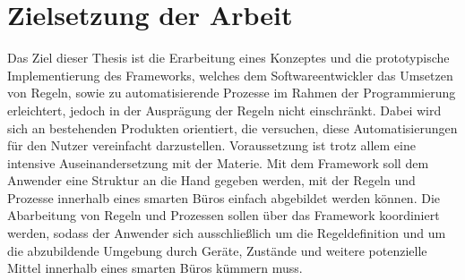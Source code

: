\section{Zielsetzung der Arbeit}
\label{sec:zielsetzung}
    Das Ziel dieser Thesis ist die Erarbeitung eines Konzeptes und die prototypische Implementierung des Frameworks, welches dem Softwareentwickler das 
    Umsetzen von Regeln, sowie zu automatisierende Prozesse im Rahmen der Programmierung erleichtert, jedoch in der Ausprägung 
    der Regeln nicht einschränkt. Dabei wird sich an bestehenden Produkten orientiert, die versuchen, diese 
    Automatisierungen für den Nutzer vereinfacht darzustellen. Voraussetzung ist trotz allem eine intensive Auseinandersetzung mit der Materie. 
    Mit dem Framework soll dem Anwender eine Struktur an die Hand gegeben werden, mit der Regeln und Prozesse innerhalb eines 
    smarten Büros einfach abgebildet werden können. Die Abarbeitung von Regeln und Prozessen sollen über das Framework 
    koordiniert werden, sodass der Anwender sich ausschließlich um die Regeldefinition und um die abzubildende Umgebung durch Geräte, Zustände und weitere 
    potenzielle Mittel innerhalb eines smarten Büros kümmern muss. 





